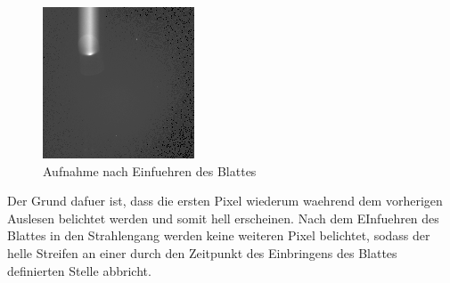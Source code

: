 \begin{figure}[h!]
\centering
        \includegraphics[width=.4\textwidth]{smear_oben_frueh.png}
\caption{ Aufnahme nach Einfuehren des Blattes }
\label{fig:smear3}
\end{figure}
Der Grund dafuer ist, dass die ersten Pixel wiederum waehrend dem vorherigen Auslesen belichtet werden und somit hell erscheinen. Nach dem EInfuehren des Blattes in den Strahlengang werden keine weiteren Pixel belichtet, sodass der helle Streifen an einer durch den Zeitpunkt des Einbringens des Blattes definierten Stelle abbricht. 
